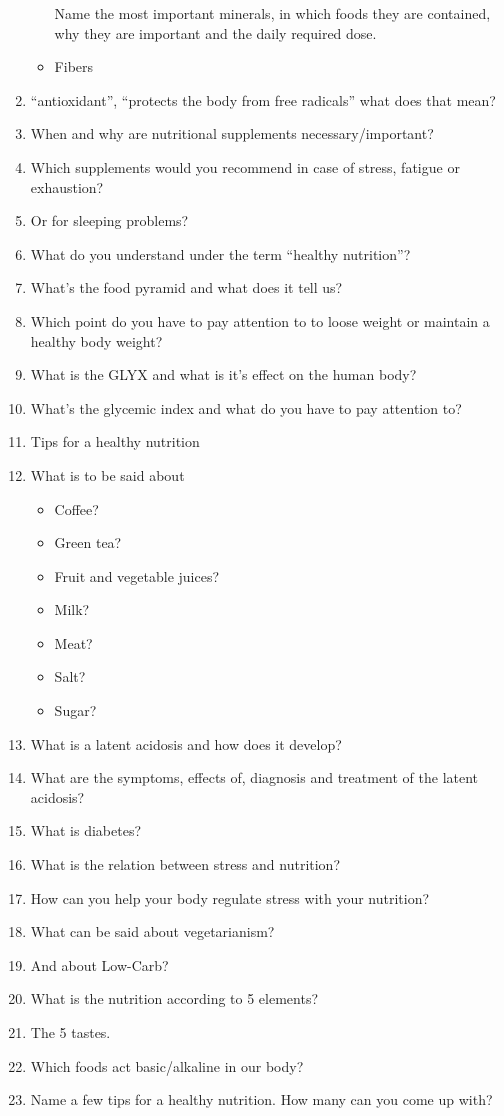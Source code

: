 \documentclass[../main.tex]{subfiles}
\begin{document}
\begin{enumerate}
\begin{itemize}
    Name the most important minerals, in which foods they are contained, why they are important and the daily required dose.
    \item Fibers
  \end{itemize}
\item ``antioxidant'', ``protects the body from free radicals'' what does that mean?
\item When and why are nutritional supplements necessary/important?
\item Which supplements would you recommend in case of stress, fatigue or exhaustion?
\item Or for sleeping problems?
\item What do you understand under the term ``healthy nutrition''?
\item What's the food pyramid and what does it tell us?
\item Which point do you have to pay attention to to loose weight or maintain a healthy body weight?
\item What is the GLYX and what is it's effect on the human body?
\item What's the glycemic index and what do you have to pay attention to?
\item Tips for a healthy nutrition
  \item What is to be said about
    \begin{itemize}
    \item Coffee?
    \item Green tea?
    \item Fruit and vegetable juices?
    \item Milk?
      \item Meat?
      \item Salt?
        \item Sugar?
    \end{itemize}
    \item What is a latent acidosis and how does it develop?
    \item What are the symptoms, effects of, diagnosis and treatment of the latent acidosis?
    \item What is diabetes?
      \item What is the relation between stress and nutrition?
    \item How can you help your body regulate stress with your nutrition?
    \item What can be said about vegetarianism?
    \item And about Low-Carb?
    \item What is the nutrition according to 5 elements?
    \item The 5 tastes.
    \item Which foods act basic/alkaline in our body?
      \item Name a few tips for a healthy nutrition. How many can you come up with?
\end{enumerate}
\end{document}
